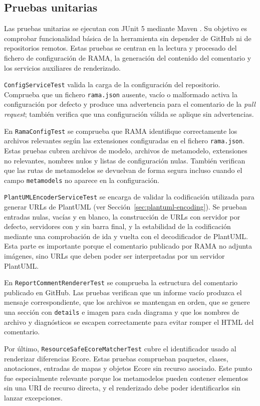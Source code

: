 \documentclass[11pt]{article}
\begin{document}
\subsection{Pruebas unitarias}

Las pruebas unitarias se ejecutan con JUnit 5 mediante Maven \cite{junit5,maven-surefire}. Su objetivo es comprobar funcionalidad básica de la herramienta sin depender de GitHub ni de repositorios remotos. Estas pruebas se centran en la lectura y procesado del fichero de configuración de RAMA, la generación del contenido del comentario y los servicios auxiliares de renderizado.

\texttt{ConfigServiceTest} valida la carga de la configuración del repositorio. Comprueba que un fichero \texttt{rama.json} ausente, vacío o malformado activa la configuración por defecto y produce una advertencia para el comentario de la \textit{pull request}; también verifica que una configuración válida se aplique sin advertencias.

En \texttt{RamaConfigTest} se comprueba que RAMA identifique correctamente los archivos relevantes según las extensiones configuradas en el fichero \texttt{rama.json}. Estas pruebas cubren archivos de modelo, archivos de metamodelo, extensiones no relevantes, nombres nulos y listas de configuración nulas. También verifican que las rutas de metamodelos se devuelvan de forma segura incluso cuando el campo \texttt{metamodels} no aparece en la configuración.

\texttt{PlantUMLEncoderServiceTest} se encarga de validar la codificación utilizada para generar URLs de PlantUML (ver Sección~\ref{sec:plantuml-encoding}). Se prueban entradas nulas, vacías y en blanco, la construcción de URLs con servidor por defecto, servidores con y sin barra final, y la estabilidad de la codificación mediante una comprobación de ida y vuelta con el decodificador de PlantUML. Esta parte es importante porque el comentario publicado por RAMA no adjunta imágenes, sino URLs que deben poder ser interpretadas por un servidor PlantUML.

En \texttt{ReportCommentRendererTest} se comprueba la estructura del comentario publicado en GitHub. Las pruebas verifican que un informe vacío produzca el mensaje correspondiente, que los archivos se mantengan en orden, que se genere una sección con \texttt{details} e imagen para cada diagrama y que los nombres de archivo y diagnósticos se escapen correctamente para evitar romper el HTML del comentario.

Por último, \texttt{ResourceSafeEcoreMatcherTest} cubre el identificador usado al renderizar diferencias Ecore. Estas pruebas comprueban paquetes, clases, anotaciones, entradas de mapas y objetos Ecore sin recurso asociado. Este punto fue especialmente relevante porque los metamodelos pueden contener elementos sin una URI de recurso directa, y el renderizado debe poder identificarlos sin lanzar excepciones.
\end{document}
